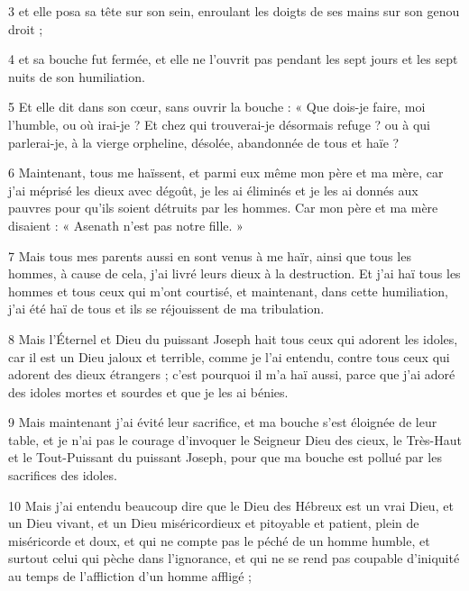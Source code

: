 \par 3 et elle posa sa tête sur son sein, enroulant les doigts de ses mains sur son genou droit ;

\par 4 et sa bouche fut fermée, et elle ne l'ouvrit pas pendant les sept jours et les sept nuits de son humiliation.

\par 5 Et elle dit dans son cœur, sans ouvrir la bouche : « Que dois-je faire, moi l'humble, ou où irai-je ? Et chez qui trouverai-je désormais refuge ? ou à qui parlerai-je, à la vierge orpheline, désolée, abandonnée de tous et haïe ?

\par 6 Maintenant, tous me haïssent, et parmi eux même mon père et ma mère, car j'ai méprisé les dieux avec dégoût, je les ai éliminés et je les ai donnés aux pauvres pour qu'ils soient détruits par les hommes. Car mon père et ma mère disaient : « Asenath n’est pas notre fille. »

\par 7 Mais tous mes parents aussi en sont venus à me haïr, ainsi que tous les hommes, à cause de cela, j'ai livré leurs dieux à la destruction. Et j'ai haï tous les hommes et tous ceux qui m'ont courtisé, et maintenant, dans cette humiliation, j'ai été haï de tous et ils se réjouissent de ma tribulation.

\par 8 Mais l'Éternel et Dieu du puissant Joseph hait tous ceux qui adorent les idoles, car il est un Dieu jaloux et terrible, comme je l'ai entendu, contre tous ceux qui adorent des dieux étrangers ; c'est pourquoi il m'a haï aussi, parce que j'ai adoré des idoles mortes et sourdes et que je les ai bénies.

\par 9 Mais maintenant j'ai évité leur sacrifice, et ma bouche s'est éloignée de leur table, et je n'ai pas le courage d'invoquer le Seigneur Dieu des cieux, le Très-Haut et le Tout-Puissant du puissant Joseph, pour que ma bouche est pollué par les sacrifices des idoles.

\par 10 Mais j'ai entendu beaucoup dire que le Dieu des Hébreux est un vrai Dieu, et un Dieu vivant, et un Dieu miséricordieux et pitoyable et patient, plein de miséricorde et doux, et qui ne compte pas le péché de un homme humble, et surtout celui qui pèche dans l'ignorance, et qui ne se rend pas coupable d'iniquité au temps de l'affliction d'un homme affligé ;

